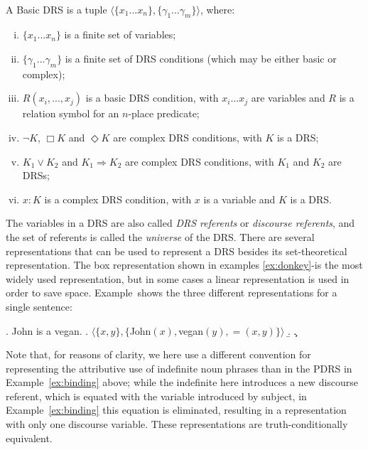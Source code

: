 \begin{definition} \label{def:bDRS}~\\
A Basic DRS is a tuple $\langle \{x_1 ... x_n\},\{\gamma_1 ... \gamma_m\} 
\rangle$, where:
 \begin{enumerate}[i.]
  \item $\{x_1 ... x_n\}$ is a finite set of variables;
  \item $\{\gamma_1 ... \gamma_m\}$ is a finite set of DRS conditions (which
    may be either basic or complex);
  \item\label{def:bDRS:Rel} $R(x_i, ..., x_j)$ is a basic DRS condition,
    with $x_i ... x_j$ are variables and $R$ is a relation symbol for an
    $n$-place predicate;
  \item $\neg K$, $\Box K$ and $\Diamond K$ are complex DRS conditions, with
    $K$ is a DRS;
  \item $K_1 \vee K_2$ and $K_1 \Rightarrow K_2$ are complex DRS conditions,
    with $K_1$ and $K_2$ are DRSs;
  \item \label{def:bDRS:Prop} $x:K$ is a complex DRS condition, with $x$ is
    a variable and $K$ is a DRS.
 \end{enumerate} 
\end{definition}

\noindent The variables in a DRS are also called \textit{DRS referents} or
\textit{discourse referents}, and the set of referents is called the
\textit{universe} of the DRS.  There are several representations that can be
used to represent a DRS besides its set-theoretical representation. The box
representation shown in examples \ref{ex:donkey}-\Last is the most widely
used representation, but in some cases a linear representation is used in
order to save space. Example~\Next shows the three different
representations for a single sentence:

\ex. John is a vegan.
\a. $\langle \{x, y\},\{$John$(x),$vegan$(y), =(x,y)\}\rangle$
\b. 
\c. 

Note that, for reasons of clarity, we here use a different convention for
representing the attributive use of indefinite noun phrases than in the
PDRS in Example~\ref{ex:binding} above; while the indefinite here introduces
a new discourse referent, which is equated with the variable introduced by
subject, in Example~\ref{ex:binding} this equation is eliminated, resulting
in a representation with only one discourse variable.  These representations
are truth-conditionally equivalent.

